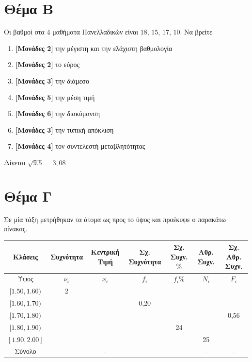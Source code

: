 \documentclass[10pt]{article}
\begin{document}
\section*{Θέμα Β}
  \noindent
Οι βαθμοί στα 4 μαθήματα Πανελλαδικών είναι $18$, $15$, $17$, $10$. Να βρείτε
  \begin{enumerate}
    \item \textbf{[Μονάδες 2]} την μέγιστη και την ελάχιστη βαθμολογία
    \item \textbf{[Μονάδες 2]} το εύρος
    \item \textbf{[Μονάδες 3]} την διάμεσο
    \item \textbf{[Μονάδες 5]} την μέση τιμή
    \item \textbf{[Μονάδες 6]} την διακύμανση
    \item \textbf{[Μονάδες 3]} την τυπική απόκλιση
    \item \textbf{[Μονάδες 4]} τον συντελεστή μεταβλητότητας
  \end{enumerate}
Δίνεται $\sqrt{9.5}=3,08$

\section*{Θέμα Γ}
  \noindent

Σε μία τάξη μετρήθηκαν τα άτομα ως προς το ύψος και προέκυψε ο παρακάτω πίνακας.
\begin{center}
\begin{tabular}{| c | c | c | c | c | c | c |} \hline
  Κλάσεις & Συχνότητα & Κεντρική Τιμή & Σχ. Συχνότητα & Σχ. Συχν. $\%$ &  Αθρ. Συχν. & Σχ. Αθρ. Συχν.\\ \hline
  Ύψος & $ν_i$ & $x_i$ & $f_i$ & $f_i\%$ & $Ν_i$ & $F_i$ \\ \hline
  $[1.50, 1.60)$ & 2 &   &      &    &    &  \\ \hline
  $[1.60, 1.70)$ &   &   & 0,20 &    &    &  \\ \hline
  $[1.70, 1.80)$ &   &   &      &    &    & 0,56 \\ \hline
  $[1.80, 1.90)$ &   &   &      & 24 &    &  \\ \hline
  $[1.90, 2.00]$ &   &   &      &    & 25 &  \\ \hline
  Σύνολο &  & - & &  & - & - \\ \hline
\end{tabular}
\end{center}
\end{document}
